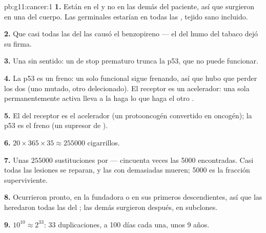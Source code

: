 \begin{solution}{pb:g11:cancer:1}
\textbf{1.} Están en el  y no en las demás  del paciente,
así que surgieron en una  del cuerpo. Las  germinales
estarían en todas las , tejido sano incluido.

\textbf{2.} Que casi todas las  del  las causó el
benzopireno --- el  del humo del tabaco dejó su firma.

\textbf{3.} Una  sin sentido: un  de stop prematuro trunca
la p53, que no puede funcionar.

\textbf{4.} La p53 es un freno: un solo  funcional sigue frenando,
así que hubo que perder los dos (uno mutado, otro delecionado). El
receptor es un acelerador: una sola  permanentemente activa
lleva a la  haga lo que haga el otro .

\textbf{5.} El  del receptor es el acelerador (un protooncogén
convertido en oncogén); la p53 es el freno (un supresor de ).

\textbf{6.} $20 \times 365 \times 35 \approx \num{255000}$ cigarrillos.

\textbf{7.} Unas $\num{255000}$ sustituciones por  --- cincuenta
veces las 5000 encontradas. Casi todas las lesiones se reparan, y las
 con demasiadas  mueren; 5000 es la fracción
superviviente.

\textbf{8.} Ocurrieron pronto, en la  fundadora o en sus primeros
descendientes, así que las heredaron todas las  del ; las
demás surgieron después, en subclones.

\textbf{9.} $10^{10} \approx 2^{33}$: 33 duplicaciones, a 100 días cada
una, unos 9 años.


\end{solution}
